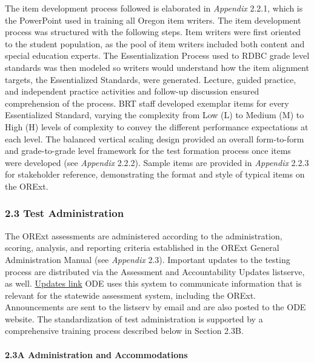 \documentclass[]{article}
\let\oldparagraph\paragraph
\renewcommand{\paragraph}[1]{\oldparagraph{#1}\mbox{}}
\begin{document}
The item development process followed is elaborated in \emph{Appendix}
2.2.1, which is the PowerPoint used in training all Oregon item writers.
The item development process was structured with the following steps.
Item writers were first oriented to the student population, as the pool
of item writers included both content and special education experts. The
Essentialization Process used to RDBC grade level standards was then
modeled so writers would understand how the item alignment targets, the
Essentialized Standards, were generated. Lecture, guided practice, and
independent practice activities and follow-up discussion ensured
comprehension of the process. BRT staff developed exemplar items for
every Essentialized Standard, varying the complexity from Low (L) to
Medium (M) to High (H) levels of complexity to convey the different
performance expectations at each level. The balanced vertical scaling
design provided an overall form-to-form and grade-to-grade level
framework for the test formation process once items were developed (see
\emph{Appendix} 2.2.2). Sample items are provided in \emph{Appendix}
2.2.3 for stakeholder reference, demonstrating the format and style of
typical items on the ORExt.

\subsubsection{2.3 Test Administration}\label{test-administration}

The ORExt assessments are administered according to the administration,
scoring, analysis, and reporting criteria established in the ORExt
General Administration Manual (see \emph{Appendix} 2.3). Important
updates to the testing process are distributed via the Assessment and
Accountability Updates listserve, as well. \color{link}
\href{http://www.oregon.gov/ode/educator-resources/assessment/Pages/Assessment-and-Accountability-Update.aspx}{Updates
link} \color{black} ODE uses this system to communicate information that
is relevant for the statewide assessment system, including the ORExt.
Announcements are sent to the listserv by email and are also posted to
the ODE website. The standardization of test administration is supported
by a comprehensive training process described below in Section 2.3B.

\paragraph{2.3A Administration and
Accommodations}\label{a-administration-and-accommodations}
\end{document}
